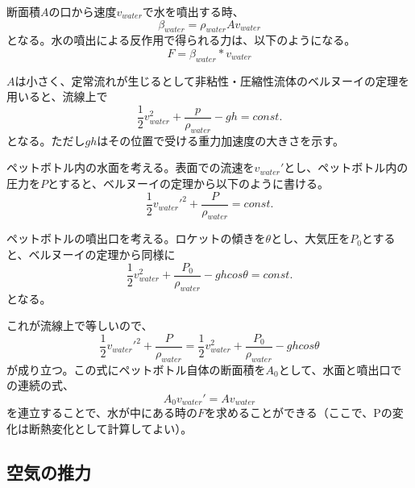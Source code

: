 \documentclass{article}
\begin{document}
断面積$A$の口から速度$v_{water}$で水を噴出する時、
\begin{equation}
\beta_{water} = \rho_{water} A v_{water}
\end{equation}
となる。水の噴出による反作用で得られる力は、以下のようになる。
\begin{equation}
F = \beta_{water} * v_{water}
\end{equation}

$A$は小さく、定常流れが生じるとして非粘性・圧縮性流体のベルヌーイの定理を用いると、流線上で
\begin{equation}
\frac{1}{2} v_{water}^2 + \frac{p}{\rho_{water}} - g h = const.
\end{equation}
となる。ただし$g h$はその位置で受ける重力加速度の大きさを示す。

ペットボトル内の水面を考える。表面での流速を$v_{water}'$とし、ペットボトル内の圧力を$P$とすると、ベルヌーイの定理から以下のように書ける。
\begin{equation}
\frac{1}{2} v_{water}'^2 + \frac{P}{\rho_{water}} = const.
\end{equation}

ペットボトルの噴出口を考える。ロケットの傾きを$\theta$とし、大気圧を$P_0$とすると、ベルヌーイの定理から同様に
\begin{equation}
\frac{1}{2} v_{water}^2 + \frac{P_0}{\rho_{water}} - g h cos \theta = const.
\end{equation}
となる。

これが流線上で等しいので、
\begin{equation}
\frac{1}{2} v_{water}'^2 + \frac{P}{\rho_{water}} = \frac{1}{2} v_{water}^2 + \frac{P_0}{\rho_{water}} - g h cos \theta
\end{equation}
が成り立つ。この式にペットボトル自体の断面積を$A_0$として、水面と噴出口での連続の式、
\begin{equation}
A_0 v_{water}' = A v_{water}
\end{equation}
を連立することで、水が中にある時の$F$を求めることができる（ここで、Pの変化は断熱変化として計算してよい）。

\subsection{ 空気の推力 }
\end{document}
